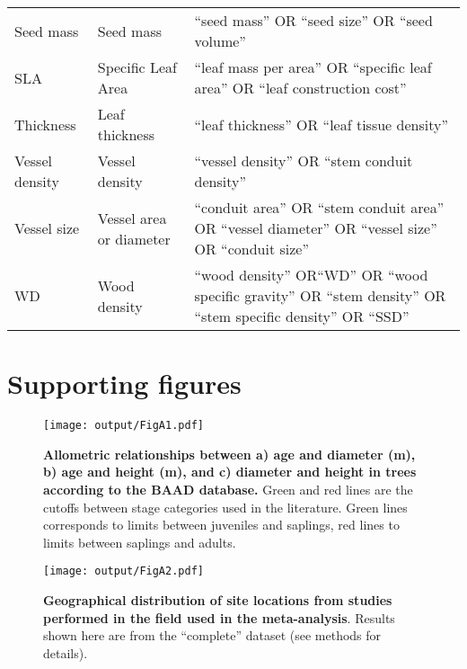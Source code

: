 \documentclass[a4paper,11pt]{article}
\begin{document}
\begin{appendices}
\begin{table}[h!]
{\begin{tabular}{p{3cm}p{3cm}p{8cm}}
  Seed mass & Seed mass & ``seed mass'' OR ``seed size'' OR ``seed volume'' \\
  SLA & Specific Leaf Area & ``leaf mass per area'' OR ``specific leaf area'' OR ``leaf construction cost'' \\
  Thickness & Leaf thickness & ``leaf thickness''  OR ``leaf tissue density'' \\
  Vessel density & Vessel density & ``vessel density'' OR ``stem conduit density'' \\
  Vessel size & Vessel area or diameter & ``conduit area'' OR ``stem conduit area'' OR ``vessel diameter'' OR ``vessel size'' OR ``conduit size''   \\
  WD & Wood density & ``wood density'' OR``WD'' OR ``wood specific gravity'' OR ``stem density'' OR ``stem specific density'' OR ``SSD'' \\
   \hline
\end{tabular}
}
\end{table}


\clearpage
\section{Supporting figures}\label{app:supp_info_figures}


\begin{figure}[h!]
\centering
\texttt{[image: output/FigA1.pdf]}
\caption{\textbf{Allometric relationships between a) age and diameter (m), b) age and height (m), and c) diameter and height in trees according to the BAAD database.} Green and red lines are the cutoffs between stage categories used in the literature. Green lines corresponds to limits between juveniles and saplings, red lines to limits between saplings and adults.}
\label{fig:figA1}
\end{figure}


\begin{figure}[h!]
\centering
\texttt{[image: output/FigA2.pdf]}
\caption{\textbf{Geographical distribution of site locations from studies performed in the field used in the meta-analysis}. Results shown here are from the ``complete'' dataset (see methods for details).}
\label{fig:figA2}
\end{figure}



\end{appendices}
\end{document}
